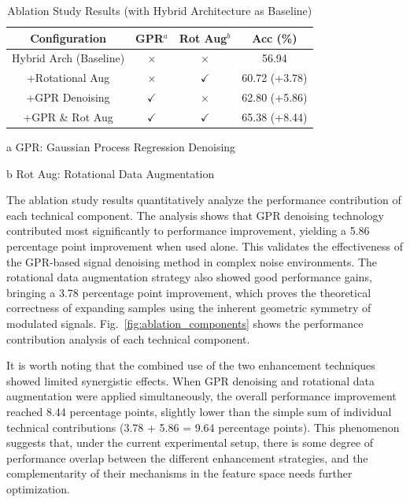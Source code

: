 \documentclass[conference]{IEEEtran}
\begin{document}
\begin{table}[!htbp]
\centering
\caption{Ablation Study Results (with Hybrid Architecture as Baseline)}
\label{tab:ablation_study}
\begin{threeparttable}
\begin{tabular}{@{}cccc@{}}
\toprule
Configuration & GPR$^{a}$ & Rot Aug$^{b}$ & Acc (\%) \\
\midrule
Hybrid Arch (Baseline) & $\times$ & $\times$ & 56.94 \\
+Rotational Aug & $\times$ & $\checkmark$ & 60.72 (+3.78) \\
+GPR Denoising & $\checkmark$ & $\times$ & 62.80 (+5.86) \\
+GPR \& Rot Aug & $\checkmark$ & $\checkmark$ & 65.38 (+8.44) \\
\bottomrule
\end{tabular}
\begin{tablenotes}
\footnotesize
\item[a] GPR: Gaussian Process Regression Denoising
\item[b] Rot Aug: Rotational Data Augmentation
\end{tablenotes}
\end{threeparttable}
\end{table}

The ablation study results quantitatively analyze the performance contribution of each technical component. The analysis shows that GPR denoising technology contributed most significantly to performance improvement, yielding a 5.86 percentage point improvement when used alone. This validates the effectiveness of the GPR-based signal denoising method in complex noise environments. The rotational data augmentation strategy also showed good performance gains, bringing a 3.78 percentage point improvement, which proves the theoretical correctness of expanding samples using the inherent geometric symmetry of modulated signals. Fig.~\ref{fig:ablation_components} shows the performance contribution analysis of each technical component.

It is worth noting that the combined use of the two enhancement techniques showed limited synergistic effects. When GPR denoising and rotational data augmentation were applied simultaneously, the overall performance improvement reached 8.44 percentage points, slightly lower than the simple sum of individual technical contributions (3.78 + 5.86 = 9.64 percentage points). This phenomenon suggests that, under the current experimental setup, there is some degree of performance overlap between the different enhancement strategies, and the complementarity of their mechanisms in the feature space needs further optimization.
\end{document}
